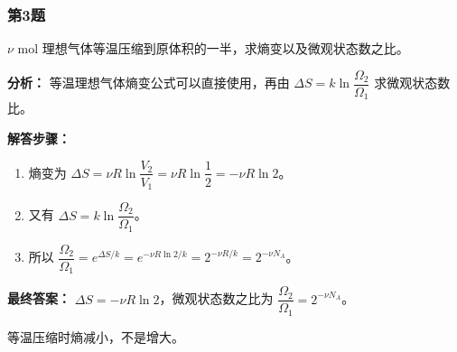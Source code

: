 \documentclass[12pt,a4paper]{ctexart}
\begin{document}
\subsubsection*{第3题}
\begin{tcolorbox}[colback=gray!2!white,colframe=black!60,title={题目}]
\(\nu\) mol 理想气体等温压缩到原体积的一半，求熵变以及微观状态数之比。\par
\end{tcolorbox}
\begin{tcolorbox}[colback=blue!2!white,colframe=blue!55!black,title={完整答案}]
\textbf{分析：}
等温理想气体熵变公式可以直接使用，再由 \(\Delta S=k\ln \dfrac{\Omega_2}{\Omega_1}\) 求微观状态数比。\par
\textbf{解答步骤：}
\begin{enumerate}
\item 熵变为 \(\Delta S=\nu R\ln\dfrac{V_2}{V_1}=\nu R\ln\dfrac12=-\nu R\ln 2\)。
\item 又有 \(\Delta S=k\ln\dfrac{\Omega_2}{\Omega_1}\)。
\item 所以 \(\dfrac{\Omega_2}{\Omega_1}=e^{\Delta S/k}=e^{-\nu R\ln 2/k}=2^{-\nu R/k}=2^{-\nu N_A}\)。
\end{enumerate}
\textbf{最终答案：}
\(\Delta S=-\nu R\ln 2\)，微观状态数之比为 \(\dfrac{\Omega_2}{\Omega_1}=2^{-\nu N_A}\)。\par
\end{tcolorbox}
\begin{tcolorbox}[colback=red!2!white,colframe=red!55!black,title={易错点}]
等温压缩时熵减小，不是增大。\par
\end{tcolorbox}
\end{document}
